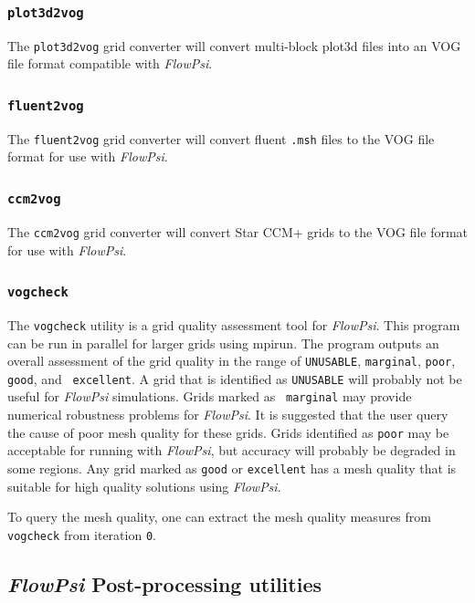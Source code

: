 \documentclass{article}
\begin{document}
\subsubsection{\tt plot3d2vog}

The {\tt plot3d2vog} grid converter will convert multi-block plot3d
files into an VOG file format compatible with {\em FlowPsi}.

\subsubsection{\tt fluent2vog}

The {\tt fluent2vog} grid converter will convert fluent {\tt .msh}
files to the VOG file format for use with {\em FlowPsi}.

\subsubsection{\tt ccm2vog}

The {\tt ccm2vog} grid converter will convert Star CCM+ grids to the VOG file format for use with {\em FlowPsi}.


\subsubsection{\tt vogcheck}

The {\tt vogcheck} utility is a grid quality assessment tool for {\em FlowPsi}.
This program can be run in parallel for larger grids using mpirun.
The program outputs an overall assessment of the grid quality in the
range of {\tt UNUSABLE}, {\tt marginal}, {\tt poor}, {\tt good}, and {\tt
  excellent}.  A grid that is identified as {\tt UNUSABLE} will
probably not be useful for {\em FlowPsi} simulations.  Grids marked as {\tt
  marginal} may provide numerical robustness problems for {\em FlowPsi}.  It is
suggested that the user query the cause of poor mesh quality for these
grids.  Grids identified as {\tt poor} may be acceptable for
running with {\em FlowPsi}, but accuracy will probably be degraded in some
regions.  Any grid marked as {\tt good} or {\tt excellent} has a mesh
quality that is suitable for high quality solutions using {\em FlowPsi}.

To query the mesh quality, one can extract the mesh quality measures
from {\tt vogcheck} from iteration {\tt 0}.


\subsection{{\em FlowPsi} Post-processing utilities}
\end{document}
